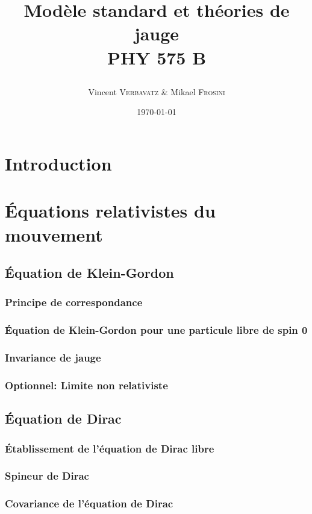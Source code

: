 \documentclass{article}
\title{Modèle standard et théories de jauge \n{2} \\\textsc{PHY 575 B}\\\n2 \date{\today}}
\author{Vincent \textsc{Verbavatz} \& Mikael \textsc{Frosini}}
\begin{document}
		
		\maketitle
		\pagebreak
		\tableofcontents
		
		\pagebreak
		
	\section{Introduction}

	\section{Équations relativistes du mouvement}
			
		\subsection{Équation de Klein-Gordon}
			\subsubsection{Principe de correspondance}
			\subsubsection{Équation de Klein-Gordon pour une particule libre de spin 0}
			\subsubsection{Invariance de jauge}
			\subsubsection{Optionnel: Limite non relativiste}
		\subsection{Équation de Dirac}
			\subsubsection{Établissement de l'équation de Dirac libre}
			\subsubsection{Spineur de Dirac}
			\subsubsection{Covariance de l'équation de Dirac}
\end{document}
